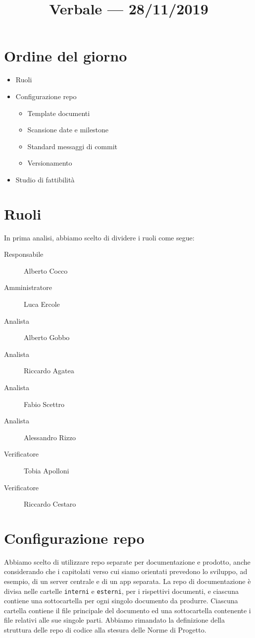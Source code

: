 \documentclass{article}
\title{Verbale --- 28/11/2019}
\begin{document}


\section{Ordine del giorno}%
\label{sec:ordine_del_giorno}

\begin{itemize}
  \item Ruoli
  \item Configurazione repo
        \begin{itemize}
          \item Template documenti
          \item Scansione date e milestone
          \item Standard messaggi di commit
          \item Versionamento
        \end{itemize}
  \item Studio di fattibilità
\end{itemize}

\section{Ruoli}%
\label{sec:ruoli}

In prima analisi, abbiamo scelto di dividere i ruoli come segue:

\begin{description}
  \item[Responsabile] Alberto Cocco
  \item[Amministratore] Luca Ercole
  \item[Analista] Alberto Gobbo
  \item[Analista] Riccardo Agatea
  \item[Analista] Fabio Scettro
  \item[Analista] Alessandro Rizzo
  \item[Verificatore] Tobia Apolloni
  \item[Verificatore] Riccardo Cestaro
\end{description}

\section{Configurazione repo}%
\label{sec:configurazione_repo}

Abbiamo scelto di utilizzare repo separate per documentazione e prodotto, anche considerando che i capitolati verso cui siamo orientati prevedono lo sviluppo, ad esempio, di un server centrale e di un app separata.
La repo di documentazione è divisa nelle cartelle \verb|interni| e \verb|esterni|, per i rispettivi documenti, e ciascuna contiene una sottocartella per ogni singolo documento da produrre.
Ciascuna cartella contiene il file principale del documento ed una sottocartella contenente i file relativi alle sue singole parti.
Abbiamo rimandato la definizione della struttura delle repo di codice alla stesura delle Norme di Progetto.
\end{document}
